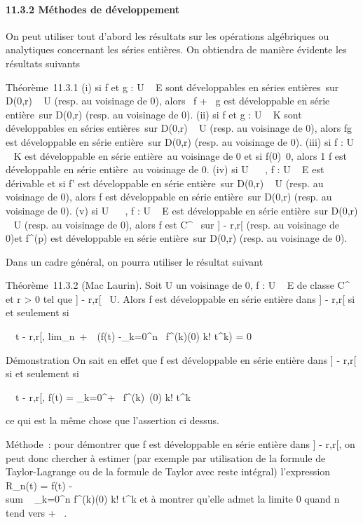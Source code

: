 \documentclass[]{article}
\begin{document}
\paragraph{11.3.2 Méthodes de développement}

On peut utiliser tout d'abord les résultats sur les opérations
algébriques ou analytiques concernant les séries entières. On obtiendra
de manière évidente les résultats suivants

Théorème~11.3.1 (i) si f et g : U \rightarrow~ E sont développables en séries
entières~sur D(0,r) \subset~ U (resp. au voisinage de 0), alors \alpha~f + \beta~g est
développable en série entière~sur D(0,r) (resp. au voisinage de 0). (ii)
si f et g : U \rightarrow~ K sont développables en séries entières~sur D(0,r) \subset~ U
(resp. au voisinage de 0), alors fg est développable en série
entière~sur D(0,r) (resp. au voisinage de 0). (iii) si f : U \rightarrow~ K est
développable en série entière~au voisinage de 0 et si
f(0)\neq~0, alors  1 \over f
est développable en série entière~au voisinage de 0. (iv) si U \subset~ ~, f :
U \rightarrow~ E est dérivable et si f' est développable en série entière~sur
D(0,r) \subset~ U (resp. au voisinage de 0), alors f est développable en série
entière~sur D(0,r) (resp. au voisinage de 0). (v) si U \subset~ ~, f : U \rightarrow~ E
est développable en série entière~sur D(0,r) \subset~ U (resp. au voisinage de
0), alors f est C^\infty~ sur {]} - r,r{[} (resp. au voisinage de
0)et f^(p) est développable en série entière~sur D(0,r)
(resp. au voisinage de 0).

Dans un cadre général, on pourra utiliser le résultat suivant

Théorème~11.3.2 (Mac Laurin). Soit U un voisinage de 0, f : U \rightarrow~ E de
classe C^\infty~ et r \textgreater{} 0 tel que {]} - r,r{[}\subset~ U.
Alors f est développable en série entière dans {]} - r,r{[} si et
seulement si

\forall~~t \in{]} - r,r{[},
lim\_n\rightarrow~+\infty~~\left (f(t)
-\sum \_k=0^n~
f^(k)(0) \over k!
t^k\right ) = 0

Démonstration On sait en effet que f est développable en série entière
dans {]} - r,r{[} si et seulement si

\forall~~t \in{]} - r,r{[}, f(t) =
\sum \_k=0^+\infty~ f^(k)~(0)
\over k! t^k

ce qui est la même chose que l'assertion ci dessus.

Méthode~: pour démontrer que f est développable en série entière dans
{]} - r,r{[}, on peut donc chercher à estimer (par exemple par
utilisation de la formule de Taylor-Lagrange ou de la formule de Taylor
avec reste intégral) l'expression R\_n(t) = f(t)
-\\sum ~
\_k=0^n f^(k)(0) \over k!
t^k et à montrer qu'elle admet la limite 0 quand n tend vers
+ \infty~.
\end{document}
